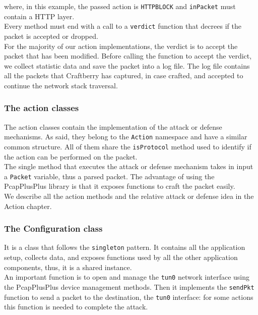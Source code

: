 \documentclass[12pt]{article}
\begin{document}
	where, in this example, the passed action is \lstinline{HTTPBLOCK} and \lstinline{inPacket} must contain a HTTP layer.\\
	Every method must end with a call to a \lstinline{verdict} function that decrees if the packet is accepted or dropped.\\
	For the majority of our action implementations, the verdict is to accept the packet that has been modified. Before calling the function to accept the verdict, we collect statistic data and save the packet into a log file. The log file contains all the packets that Craftberry has captured, in case crafted, and accepted to continue the network stack traversal.

	\subsubsection{The action classes}

	The action classes contain the implementation of the attack or defense mechanisms. As said, they belong to the \lstinline{Action} namespace and have a similar common structure. All of them share the \lstinline{isProtocol} method used to identify if the action can be performed on the packet.\\
	The single method that executes the attack or defense mechanism takes in input a \lstinline{Packet} variable, thus a parsed packet. The advantage of using the PcapPlusPlus library is that it exposes functions to craft the packet easily.\\
	\bigbreak
	We describe all the action methods and the relative attack or defense idea in the Action chapter.

	\subsubsection{The Configuration class}
	
	It is a class that follows the \lstinline{singleton} pattern. It contains all the application setup, collects data, and exposes functions used by all the other application components, thus, it is a shared instance.\\
	\bigbreak
	An important function is to open and manage the \lstinline{tun0} network interface using the PcapPlusPlus device management methods. Then it implements the \lstinline{sendPkt} function to send a packet to the destination, the \lstinline{tun0} interface: for some actions this function is needed to complete the attack.\\
	
\end{document}

